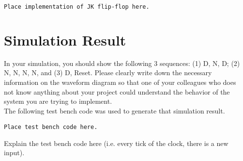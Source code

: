\documentclass{article}
\begin{document}
\begin{verbatim}
Place implementation of JK flip-flop here.
\end{verbatim}


\section{Simulation Result}
In your simulation, you should show the following 3 sequences: (1) D, N, D;
(2) N, N, N, N, and (3) D, Reset. Please clearly write down the necessary 
information on the waveform diagram so that one of your colleagues who does 
not know anything about your project could understand the behavior of the 
system you are trying to implement.\\

The following test bench code was used to generate that simulation result.

\begin{verbatim}
Place test bench code here.
\end{verbatim}

Explain the test bench code here (i.e. every tick of the clock, there is a new 
input).

\end{document}
